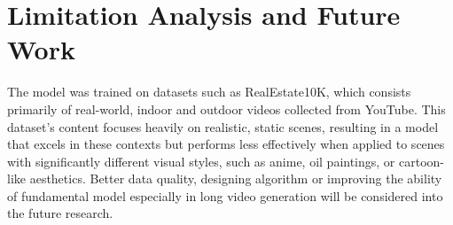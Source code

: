 \section{Limitation Analysis and Future Work}
The model was trained on datasets such as RealEstate10K, which consists primarily of real-world, indoor and outdoor videos collected from YouTube. This dataset’s content focuses heavily on realistic, static scenes, resulting in a model that excels in these contexts but performs less effectively when applied to scenes with significantly different visual styles, such as anime, oil paintings, or cartoon-like aesthetics. 
Better data quality, designing algorithm or improving the ability of fundamental model especially in long video generation will be considered into the future research.

